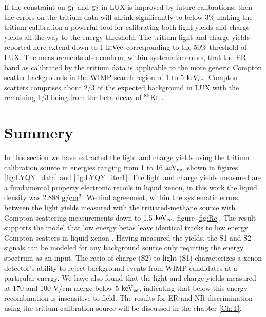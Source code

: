 If the constraint on $\rm g_1$ and $\rm g_2$ in LUX is improved by future calibrations, then the errors on the tritium data will shrink significantly to below 3\% making the tritium calibration a powerful tool for calibrating both light yields and charge yields all the way to the energy threshold. The tritium light and charge yields reported here extend down to 1 $\rm keVee$ corresponding to the 50\% threshold of LUX. The measurements also confirm, within systematic errors, that the ER band as calibrated by the tritium data is applicable to the more generic Compton scatter backgrounds in the WIMP search region of 1 to 5 $\rm keV_{ee}$. Compton scatters comprises about 2/3 of the expected background in LUX with the remaining 1/3 being from the beta decay of $\rm ^{85}Kr$ \cite{LUX_BG}.


\section{Summery}

In this section we have extracted the light and charge yields using the tritium calibration source in energies ranging from 1 to 16 $\rm keV_{ee}$, shown in figures \ref{fig:LYQY_data} and \ref{fig:LYQY_iter1}. The light and charge yields measured are a fundamental property electronic recoils in liquid xenon, in this work the liquid density was 2.888 $\rm g/cm^3$. We find agreement, within the systematic errors, between the light yields measured with the tritiated-methane source with Compton scattering measurements down to 1.5 $\rm keV_{ee}$, figure \ref{fig:Re}. The result supports the model that low energy betas leave identical tracks to low energy Compton scatters in liquid xenon \cite{NEST} \cite{NEST_2013}. Having measured the yields, the S1 and S2 signals can be modeled for any background source only requiring the energy spectrum as an input. The ratio of charge (S2) to light (S1) characterizes a xenon detector's ability to reject background events from WIMP candidates at a particular energy. We have also found that the light and charge yields measured at 170 and 100 V/cm merge below 5 $\rm keV_{ee}$, indicating that below this energy recombination is insensitive to field. The results for ER and NR discrimination using the tritium calibration source will be discussed in the chapter \ref{Ch:T}.


